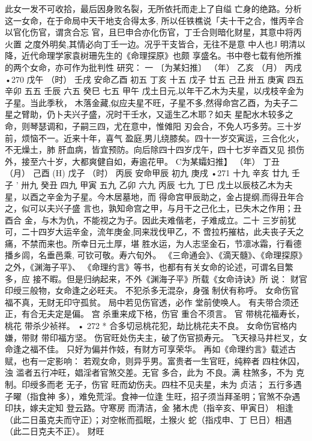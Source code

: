 此女一发不可收拾，最后因身败名裂，无所依托而走上了自缢
亡身的绝路。分析这一女命，在于命局中天干地支合得太多,
所以任铁樵说「夫十干之合，惟丙辛合以官化伤官，谓贪合忘
官，且巳申合亦化伤官，丁壬合则暗化财星，其意中将丙火置
之度外明矣,其情必向丁壬一边。况乎干支皆合，无往不是意
中人也J
明清以降，近代命理学家袁树珊先生的《命理探原》也颇
享盛名。书中卷七载有他所推的两个女命，亦可作为批判性
研究： 一
〔为某妇推〕
（年） 乙亥
（月） 丙戌
•270
戊午
（时） 壬戌
安命乙酉
初五 丁亥
十五 戊子
廿五 己丑
卅五 庚寅
四五 辛卯
五五 壬辰
六五 癸巳
七五 甲午
戊土日元,以年干乙木为夫星，以戌枝辛金为子星。当此季秋，
木落金藏,似应夫星不旺，子星不多,然得命宫乙酉，为夫子二
星之臂助，仍卜夫兴子盛，况时干壬水，又遥生乙木耶？如夫
星配水木较多之命，则琴瑟调和，子嗣三四，尤在意中，惟傩阳
刃会合，不免人巧多劳。三十岁前，烦恼不一。近来十年，喜气
盈庭,男儿绕膝矣。四十一岁交寅运，三合化火，不无燥土，肺
肝血病，皆宜预防。向后除四十四岁戊午，四十七岁辛酉又见
损伤外，接至六十岁，大都爽健自如，寿逾花甲。
C为某孀妇推】
（年） 丁丑
（月） 己酉
(H) 戊子
（时） 丙辰
安命甲辰
初九 庚戌
•271
十九 辛亥
廿九 壬子 '
卅九 癸丑
四九 甲寅
五九 乙卯
六九 丙辰
七九 丁巳
戊土以辰枝乙木为夫星，以酉之辛金为子星。今木居墓地，而
得命宫甲辰助之，金占提纲,而得丑年合之，似可以夫兴子盛
言也，孰知命宫之甲，与月干之己化土，已失木之作用；丑酉合
金，与木为仇，不能视之为子。因此夫难偕老，子难成立。二十
三岁前犹可，二十四岁大运辛金，流年庚金,同来戕伐甲乙，不
啻拉朽摧枯，此夫丧子夭之痛，不禁而来也。所幸日元土厚，堪
胜水运，为人志坚金石，节凛冰霜，行看德播乡闾，名垂邑乘,
可钦可敬。寿六旬外。
《三命通会》、《滴天髓》、《命理探原》之外，《渊海子平》、
《命理约言》等书，也都有有关女命的论述，可谓名目繁多，应
接不暇。但是归纳起来，不外《渊海子平》所载《女命诗诀》所
说：
财官印绶三般物，女命逢之必旺夫。
不犯杀多无混杂，身强 制伏有称呼。
女命伤官 福不真，无财无印守孤贫。
局中若见伤官透，必作 堂前使唤人。
有夫带合须还正，有合无夫定是偏。
宫 杀重来成下格，伤官 重合不须言。
官 带桃花福寿长，桃花 带杀少祯祥。
• 272 *
合多切忌桃花犯，劫比桃花夫不良。
女命伤官格内嫌，带财 带印福方坚。
伤官旺处伤夫主，破了伤官损寿元。
飞天禄马井栏叉，女命逢之福不佳。
只好为偏并作妓，有财方可享荣华。
再如《命理约言》载述古赋，也有一定影响：
若观女命，则异乎男。富贵者一生官旺，纯粹者
四柱休囚，浊 滥者五行冲旺，娼淫者官煞交差。无官
多合，此为 不良。满 柱煞多，不为 克制。印绶多而老
无子，伤官 旺而幼伤夫。四柱不见夫星，未为 贞洁；
五行多遇子曜（指食神 多），难免荒淫。食神一位逢
生旺，招子须当拜圣明；官煞不杂遇印扶，嫁夫定知
登云路。守寒房 而清洁，金 猪木虎（指辛亥、甲寅日）
相逢（此二日虽克夫而守正）；对空帐而孤眠，土猴火
蛇（指戍申、丁 巳日）相遇（此二日克夫不正）。 财旺
